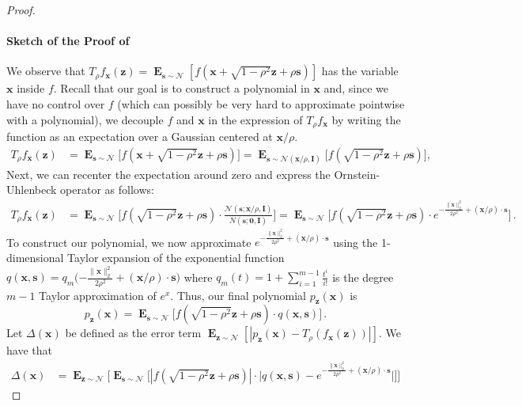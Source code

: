 \documentclass[10pt,a4paper]{article}
\newcommand\twonorm[1]{\|#1\|_2}
\renewcommand\vec[1]{\mathbf{#1}}
\DeclareMathOperator*{\E}{\mathbf{E}}
\newcommand{\normal}{\mathcal{N}}
\newcommand{\1}{\Ind}
\newcommand{\x}{\vec x}
\newcommand{\z}{\vec z}
\newcommand{\Gauss}{\mathcal{N}}
\begin{document}
\begin{proof}
\paragraph{Sketch of the Proof of }
   We observe that  $T_{\rho}f_{\x}(\z)=\E_{\vec s\sim \Gauss}[f(\x+\sqrt{1-\rho^2}\z+\rho \vec s)]$ has 
   the variable $\x$ inside $f$. Recall that our goal is to construct a polynomial in $\x$ and, since we have no control over $f$ (which can possibly be very hard to approximate pointwise with a polynomial), we decouple $f$ and $\x$ in the expression of $T_{\rho}f_{\x}$ by writing the function as an expectation over a Gaussian centered at $\x/\rho$. 
    \begin{align*}
        T_{\rho}f_{\x}(\z)&=\E_{\vec s\sim \Gauss}\bigl[f(\x+\sqrt{1-\rho^2}\z+\rho\vec s)\bigr]
        =\E_{\vec s\sim \Gauss(\vec x/\rho,\vec I)}\bigl[f(\sqrt{1-\rho^2}\z+\rho\vec s)\bigr],
        \end{align*}
        Next, we can recenter the expectation around zero and express the Ornstein-Uhlenbeck operator as follows:
    \begin{align*}
        T_{\rho}f_{\x}(\z) &=\E_{\vec s\sim \Gauss}\biggl[f(\sqrt{1-\rho^2}\z+\rho\vec s)\cdot \frac{\Gauss(\vec s;\x/\rho,\vec I)}{N(\vec s;\vec 0,\vec I)}\biggr] =
        \E_{\vec s\sim \Gauss}\biggl[
        f(\sqrt{1-\rho^2}\z+\rho\vec s)\cdot e^{-\frac{\twonorm{\x}^2}{2\rho^2}+(\x/\rho)\cdot \vec s}
        \biggr] \,.
    \end{align*}
    To construct our polynomial, we now approximate ${e^{-\frac{\twonorm{\x}^2}{2\rho^2}+ (\x/\rho)\cdot\vec s}}$ using the 1-dimensional Taylor expansion of the exponential function $q(\x,\vec s)=q_m\bigl({-\frac{\twonorm{\x}^2}{2\rho^2}+(\x/\rho)\cdot\vec s}\bigr)$ where $q_{m}(t)=1+\sum_{i=1}^{m-1}\frac{t^i}{i!}$ is the degree $m-1$ Taylor approximation of $e^x$. Thus, our final polynomial $p_{\z}(\x)$ is 
    \begin{equation}\label{eq:polynomial-p-z}
        p_{\z}(\x)=\E_{\vec s\sim \Gauss}\bigl[f(\sqrt{1-\rho^2}\z+\rho\vec s)\cdot q(\x,\vec s)\bigr]\,.
        \end{equation}
    Let $\Delta(\x)$ be defined as the error term $\E_{\z \sim \normal}[|p_{\z}(\x)-T_{\rho}(f_{\x}(\z))|]$. 
    We have that  
    \begin{align}
    \Delta(\x) &=
    \E_{\z\sim \Gauss}\Big[\E_{\vec s\sim \Gauss}\bigl[|f(\sqrt{1-\rho^2}\z+\rho\vec s)|\cdot 
    \big|q(\x,\vec s)-e^{-\frac{\twonorm{\x}^2}{2\rho^2}+(\x/\rho)\cdot\vec s}\big| \Big]  \Big]

\end{align}
\end{proof}
\end{document}
